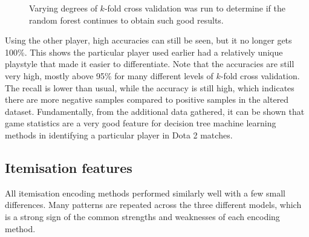 \documentclass[Report.tex]{subfiles}
\begin{document}
\renewcommand{\rfplotbar}[2] {
\addplot+[mark=none] table [x=cv, y=#1, col sep=comma] {data/14-game-rf.csv};
\addlegendentry{#2}
}
\begin{figure}[H]
\caption{Varying degrees of $k$-fold cross validation was run to determine if the random forest continues to obtain such good results.}
\end{figure}

Using the other player, high accuracies can still be seen, but it no longer gets 100\%. This shows the particular player used earlier had a relatively unique playstyle that made it easier to differentiate. Note that the accuracies are still very high, mostly above 95\% for many different levels of $k$-fold cross validation. The recall is lower than usual, while the accuracy is still high, which indicates there are more negative samples compared to positive samples in the altered dataset. Fundamentally, from the additional data gathered, it can be shown that game statistics are a very good feature for decision tree machine learning methods in identifying a particular player in Dota 2 matches. 



\subsection{Itemisation features}

All itemisation encoding methods performed similarly well with a few small differences. Many patterns are repeated across the three different models, which is a strong sign of the common strengths and weaknesses of each encoding method. 
\end{document}
